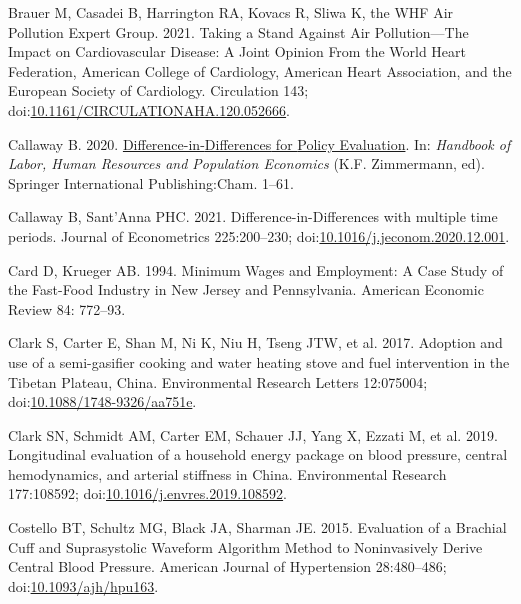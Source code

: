 \documentclass[
  letterpaper,
  DIV=11,
  numbers=noendperiod]{scrartcl}
\newlength{\cslhangindent}
\newlength{\cslentryspacingunit} %
\newenvironment{CSLReferences}[2] %
 {%
  \setlength{\parindent}{0pt}
  \ifodd #1
  \let\oldpar\par
  \def\par{\hangindent=\cslhangindent\oldpar}
  \fi
  \setlength{\parskip}{#2\cslentryspacingunit}
 }%
 {}
\begin{document}
\begin{CSLReferences}{1}{0}
\leavevmode{}%
Brauer M, Casadei B, Harrington RA, Kovacs R, Sliwa K, the WHF Air
Pollution Expert Group. 2021. Taking a {Stand Against Air
Pollution}---{The Impact} on {Cardiovascular Disease}: {A Joint Opinion
From} the {World Heart Federation}, {American College} of {Cardiology},
{American Heart Association}, and the {European Society} of
{Cardiology}. Circulation 143;
doi:\href{https://doi.org/10.1161/CIRCULATIONAHA.120.052666}{10.1161/CIRCULATIONAHA.120.052666}.

\leavevmode{}%
Callaway B. 2020.
\href{https://doi.org/10.1007/978-3-319-57365-6_352-1}{Difference-in-{Differences}
for {Policy Evaluation}}. In: \emph{Handbook of {Labor}, {Human
Resources} and {Population Economics}} (K.F. Zimmermann, ed). Springer
International Publishing:Cham. 1--61.

\leavevmode{}%
Callaway B, Sant'Anna PHC. 2021. Difference-in-{Differences} with
multiple time periods. Journal of Econometrics 225:200--230;
doi:\href{https://doi.org/10.1016/j.jeconom.2020.12.001}{10.1016/j.jeconom.2020.12.001}.

\leavevmode{}%
Card D, Krueger AB. 1994. Minimum {Wages} and {Employment}: {A Case
Study} of the {Fast-Food Industry} in {New Jersey} and {Pennsylvania}.
American Economic Review 84: 772--93.

\leavevmode{}%
Clark S, Carter E, Shan M, Ni K, Niu H, Tseng JTW, et al. 2017. Adoption
and use of a semi-gasifier cooking and water heating stove and fuel
intervention in the {Tibetan Plateau}, {China}. Environmental Research
Letters 12:075004;
doi:\href{https://doi.org/10.1088/1748-9326/aa751e}{10.1088/1748-9326/aa751e}.

\leavevmode{}%
Clark SN, Schmidt AM, Carter EM, Schauer JJ, Yang X, Ezzati M, et al.
2019. Longitudinal evaluation of a household energy package on blood
pressure, central hemodynamics, and arterial stiffness in {China}.
Environmental Research 177:108592;
doi:\href{https://doi.org/10.1016/j.envres.2019.108592}{10.1016/j.envres.2019.108592}.

\leavevmode{}%
Costello BT, Schultz MG, Black JA, Sharman JE. 2015. Evaluation of a
{Brachial Cuff} and {Suprasystolic Waveform Algorithm Method} to
{Noninvasively Derive Central Blood Pressure}. American Journal of
Hypertension 28:480--486;
doi:\href{https://doi.org/10.1093/ajh/hpu163}{10.1093/ajh/hpu163}.


\end{CSLReferences}
\end{document}

